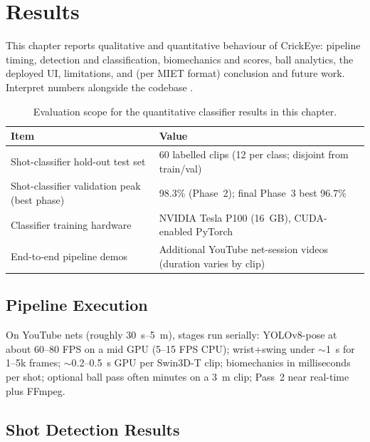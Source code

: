 \chapter{Results}
\begin{justify}

This chapter reports qualitative and quantitative behaviour of CrickEye: pipeline timing, detection and classification, biomechanics and scores, ball analytics, the deployed UI, limitations, and (per MIET format) conclusion and future work. Interpret numbers alongside the codebase \cite{YOLOv8,Liu2022Swin3D,Zuiderveld1994CLAHE,OpenCV2024,Harris2020NumPy,FFmpeg2024}.

\begin{table}[htbp]
\centering
\caption[Classifier evaluation scope.]{Evaluation scope for the quantitative classifier results in this chapter.}
\label{tab:evalscope}
\begin{tabular}{ll}
\hline
\textbf{Item} & \textbf{Value} \\
\hline
Shot-classifier hold-out test set & 60 labelled clips (12 per class; disjoint from train/val) \\
Shot-classifier validation peak (best phase) & 98.3\% (Phase~2); final Phase~3 best 96.7\% \\
Classifier training hardware & NVIDIA Tesla P100 (16~GB), CUDA-enabled PyTorch \\
End-to-end pipeline demos & Additional YouTube net-session videos (duration varies by clip) \\
\hline
\end{tabular}
\end{table}

\section{Pipeline Execution}

\par On YouTube nets (roughly 30~s--5~m), stages run serially: YOLOv8-pose at about 60--80 FPS on a mid GPU (5--15 FPS CPU); wrist+swing under $\sim$1~s for 1--5k frames; $\sim$0.2--0.5~s GPU per Swin3D-T clip; biomechanics in milliseconds per shot; optional ball pass often minutes on a 3~m clip; Pass~2 near real-time plus FFmpeg.

\section{Shot Detection Results}


\end{justify}
